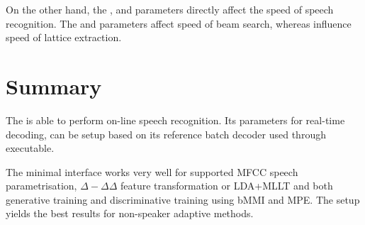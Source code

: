 On the other hand, the ,  and  parameters directly affect the speed of speech recognition. 
The  and  parameters affect speed of beam search, whereas  influence speed of lattice extraction.

\section{Summary}
\label{sec:onl_summary}
The  is able to perform on-line speech recognition.
Its parameters for real-time decoding, can be setup based on its reference batch decoder  used through  executable.

The minimal interface works very well for supported \ac{MFCC} speech parametrisation, $\Delta-\Delta\Delta$ feature transformation or \ac{LDA}+\ac{MLLT}
and both generative training and discriminative training using \ac{bMMI} and \ac{MPE}.
The setup yields the best results for non-speaker adaptive methods.

% 
